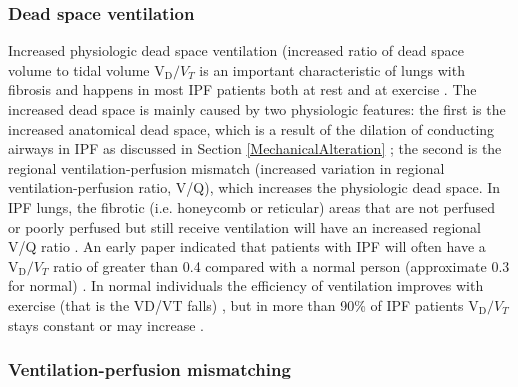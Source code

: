 \subsubsection{Dead space ventilation}
Increased physiologic dead space ventilation (increased ratio of dead space volume to tidal volume $\mathrm{V_D}/V_T$ is an important characteristic of lungs with fibrosis and happens in most IPF patients both at rest and at exercise \citep{fulmer1976diffuse, crystal1976idiopathic, agusti1991mechanisms, miki2009acidosis}. The increased dead space is mainly caused by two physiologic features: the first is the increased anatomical dead space, which is a result of the dilation of conducting airways in IPF as discussed in Section \ref{MechanicalAlteration} \citep{plantier2016increased}; the second is the regional ventilation-perfusion mismatch (increased variation in regional ventilation-perfusion ratio, V/Q), which increases the physiologic dead space. In IPF lungs, the fibrotic (i.e. honeycomb or reticular) areas that are  not perfused or poorly perfused but still receive ventilation will have an increased regional V/Q ratio \citep{strickland1993cause, plantier2018physiology}. An early paper indicated that patients with IPF will often have a $\mathrm{V_D}/V_T$ ratio of greater than 0.4 compared with a normal person (approximate 0.3 for normal) \citep{crystal1976idiopathic}. In normal individuals the efficiency of ventilation improves with exercise (that is the VD/VT falls) \citep{ jones1966physiological, wasserman1975exercise}, but in more than 90\% of IPF patients $\mathrm{V_D}/V_T$ stays constant or may increase \citep{crystal1976idiopathic}. 

\subsubsection{Ventilation-perfusion mismatching}

